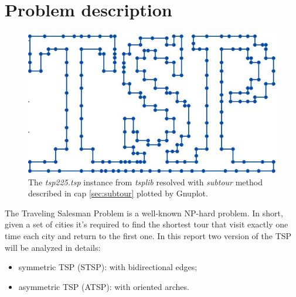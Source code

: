 \chapter{Problem description}
\label{chapter:TSPdescription}
\begin{figure}[h]
	\centering
	\includegraphics[width=.5\columnwidth]{img/tsp225_plot}
	\caption{The \textit{tsp225.tsp} instance from \textit{tsplib} resolved with \textit{subtour} method described in cap \ref{sec:subtour} plotted by Gnuplot.}
	\label{fig:tsp225}
\end{figure}

The Traveling Salesman Problem is a well-known NP-hard problem. In short, given a set of cities it's required to find the shortest tour that visit exactly one time each city and return to the first one.
In this report two version of the TSP will be analyzed in details:
\begin{itemize}
	\item symmetric TSP (STSP): with bidirectional edges;
 	\item asymmetric TSP (ATSP): with oriented arches.
\end{itemize}


